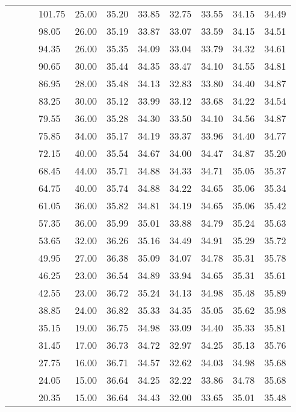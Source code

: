 \begin{longtable}{llllrrrrrrr}
   &  &  & 101.75 & 25.00 & 35.20 & 33.85 & 32.75 & 33.55 & 34.15 & 34.49 \\ 
   &  &  & 98.05 & 26.00 & 35.19 & 33.87 & 33.07 & 33.59 & 34.15 & 34.51 \\ 
   &  &  & 94.35 & 26.00 & 35.35 & 34.09 & 33.04 & 33.79 & 34.32 & 34.61 \\ 
   &  &  & 90.65 & 30.00 & 35.44 & 34.35 & 33.47 & 34.10 & 34.55 & 34.81 \\ 
   &  &  & 86.95 & 28.00 & 35.48 & 34.13 & 32.83 & 33.80 & 34.40 & 34.87 \\ 
   &  &  & 83.25 & 30.00 & 35.12 & 33.99 & 33.12 & 33.68 & 34.22 & 34.54 \\ 
   &  &  & 79.55 & 36.00 & 35.28 & 34.30 & 33.50 & 34.10 & 34.56 & 34.87 \\ 
   &  &  & 75.85 & 34.00 & 35.17 & 34.19 & 33.37 & 33.96 & 34.40 & 34.77 \\ 
   &  &  & 72.15 & 40.00 & 35.54 & 34.67 & 34.00 & 34.47 & 34.87 & 35.20 \\ 
   &  &  & 68.45 & 44.00 & 35.71 & 34.88 & 34.33 & 34.71 & 35.05 & 35.37 \\ 
   &  &  & 64.75 & 40.00 & 35.74 & 34.88 & 34.22 & 34.65 & 35.06 & 35.34 \\ 
   &  &  & 61.05 & 36.00 & 35.82 & 34.81 & 34.19 & 34.65 & 35.06 & 35.42 \\ 
   &  &  & 57.35 & 36.00 & 35.99 & 35.01 & 33.88 & 34.79 & 35.24 & 35.63 \\ 
   &  &  & 53.65 & 32.00 & 36.26 & 35.16 & 34.49 & 34.91 & 35.29 & 35.72 \\ 
   &  &  & 49.95 & 27.00 & 36.38 & 35.09 & 34.07 & 34.78 & 35.31 & 35.78 \\ 
   &  &  & 46.25 & 23.00 & 36.54 & 34.89 & 33.94 & 34.65 & 35.31 & 35.61 \\ 
   &  &  & 42.55 & 23.00 & 36.72 & 35.24 & 34.13 & 34.98 & 35.48 & 35.89 \\ 
   &  &  & 38.85 & 24.00 & 36.82 & 35.33 & 34.35 & 35.05 & 35.62 & 35.98 \\ 
   &  &  & 35.15 & 19.00 & 36.75 & 34.98 & 33.09 & 34.40 & 35.33 & 35.81 \\ 
   &  &  & 31.45 & 17.00 & 36.73 & 34.72 & 32.97 & 34.25 & 35.13 & 35.76 \\ 
   &  &  & 27.75 & 16.00 & 36.71 & 34.57 & 32.62 & 34.03 & 34.98 & 35.68 \\ 
   &  &  & 24.05 & 15.00 & 36.64 & 34.25 & 32.22 & 33.86 & 34.78 & 35.68 \\ 
   &  &  & 20.35 & 15.00 & 36.64 & 34.43 & 32.00 & 33.65 & 35.01 & 35.48 \\ 

\end{longtable}
